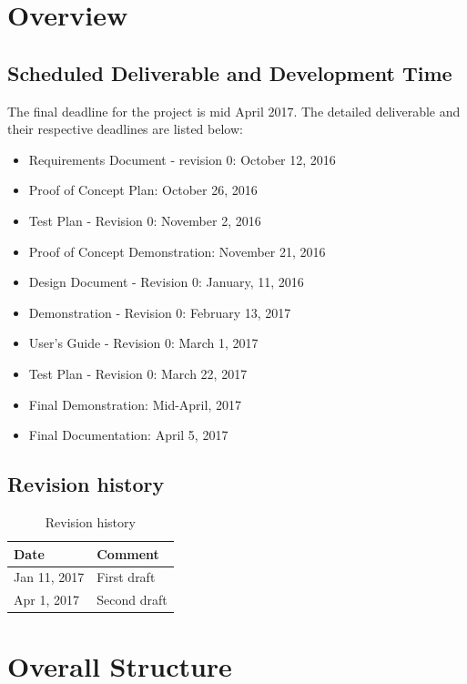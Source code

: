 \documentclass[12pt]{article}
\begin{document}
\section{Overview}

\subsection{Scheduled Deliverable and Development Time}
The final deadline for the project is mid April 2017. The detailed deliverable and their respective deadlines are listed below:
\begin{itemize}
  \item Requirements Document - revision 0: October 12, 2016 
  \item Proof of Concept Plan: October 26, 2016
  \item Test Plan - Revision 0: November 2, 2016
  \item Proof of Concept Demonstration: November 21, 2016
  \item Design Document - Revision 0: January, 11, 2016
  \item Demonstration - Revision 0: February 13, 2017
  \item User’s Guide - Revision 0: March 1, 2017
  \item Test Plan - Revision 0: March 22, 2017
  \item Final Demonstration: Mid-April, 2017
  \item Final Documentation: April 5, 2017
\end{itemize}

\subsection{Revision history}
\begin{table}[H]
\centering
\caption{Revision history}
\label{revision-history}
\begin{tabular}{|l|l|}
\toprule
Date         & Comment     \\ \hline
Jan 11, 2017 & First draft \\ \hline
Apr 1, 2017 & Second draft \\ \hline
\end{tabular}
\end{table}
\newpage



\section{Overall Structure}
\end{document}
